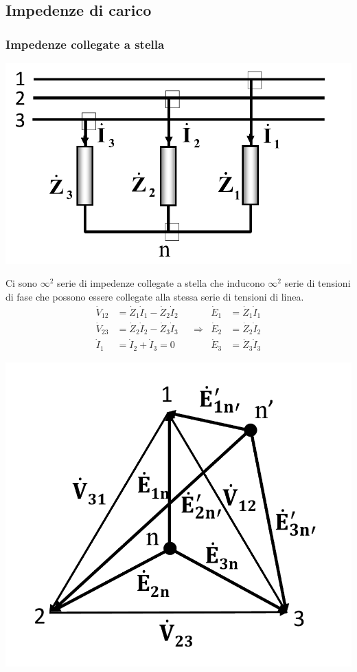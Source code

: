 \documentclass{article}
\begin{document}
\subsection{Impedenze di carico}
\subsubsection{Impedenze collegate a stella}
\begin{center}
    \includegraphics[scale=0.27]{Image/Impedenze_collegate_a_stella_1.png}
\end{center}
Ci sono $\infty^2$ serie di impedenze collegate a stella che inducono $\infty^2$ serie di tensioni di fase che possono essere collegate alla stessa serie di tensioni di linea.
\begin{align*}
    \dot V_{12} &= \dot Z_1 \dot I_1 - \dot Z_2 \dot I_2 & & 
    &
    \dot E_1 &= \dot Z_1 \dot I_1
    \\
    \dot V_{23} &= \dot Z_2 \dot I_2 - \dot Z_3 \dot I_3 & 
    &\Longrightarrow 
    &
    \dot E_2 &= \dot Z_2 \dot I_2
    \\
    \dot I_1 &= \dot I_2 + \dot I_3 = 0
    & &
    &
    \dot E_3 &= \dot Z_3 \dot I_3
\end{align*}
\begin{center}
    \includegraphics[scale=0.24]{Image/Impedenze_collegate_a_stella_2.png}
\end{center}
\end{document}
